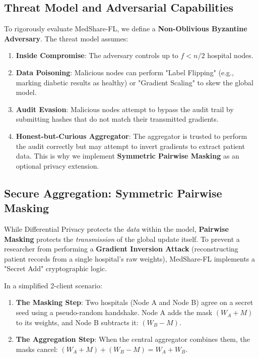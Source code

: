 \documentclass[10pt, a4paper, twocolumn]{article}
\begin{document}
\subsection{Threat Model and Adversarial Capabilities}
To rigorously evaluate MedShare-FL, we define a \textbf{Non-Oblivious Byzantine Adversary}. The threat model assumes:
\begin{enumerate}
    \item \textbf{Inside Compromise}: The adversary controls up to $f < n/2$ hospital nodes.
    \item \textbf{Data Poisoning}: Malicious nodes can perform "Label Flipping" (e.g., marking diabetic results as healthy) or "Gradient Scaling" to skew the global model.
    \item \textbf{Audit Evasion}: Malicious nodes attempt to bypass the audit trail by submitting hashes that do not match their transmitted gradients.
    \item \textbf{Honest-but-Curious Aggregator}: The aggregator is trusted to perform the audit correctly but may attempt to invert gradients to extract patient data. This is why we implement \textbf{Symmetric Pairwise Masking} as an optional privacy extension.
\end{enumerate}

\subsection{Secure Aggregation: Symmetric Pairwise Masking}
While Differential Privacy protects the \textit{data} within the model, \textbf{Pairwise Masking} protects the \textit{transmission} of the global update itself. To prevent a researcher from performing a \textbf{Gradient Inversion Attack} (reconstructing patient records from a single hospital's raw weights), MedShare-FL implements a "Secret Add" cryptographic logic. 

In a simplified 2-client scenario:
\begin{enumerate}
    \item \textbf{The Masking Step}: Two hospitals (Node A and Node B) agree on a secret seed using a pseudo-random handshake. Node A adds the mask $(W_A + M)$ to its weights, and Node B subtracts it: $(W_B - M)$.
    \item \textbf{The Aggregation Step}: When the central aggregator combines them, the masks cancel: $(W_A + M) + (W_B - M) = W_A + W_B$.
\end{enumerate}
\end{document}
